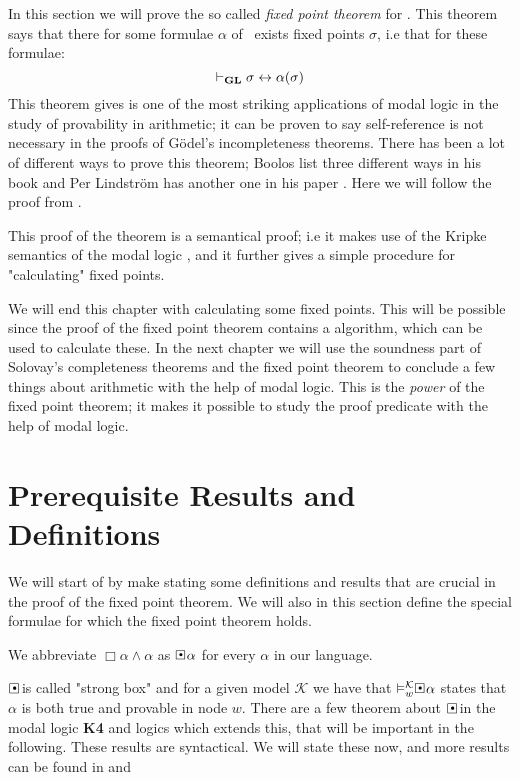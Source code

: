 \documentclass[../main.tex]{subfiles}
\begin{document}
In this section we will prove the so called \textit{fixed point theorem} for
\GL.  This theorem says that there for some formulae $\alpha$  of \GL\ exists fixed
points $\sigma$, i.e that for these formulae:
\[\vdash_{\text{\textbf{GL}}}\sigma\leftrightarrow\alpha(\sigma)\]
This theorem gives is one of the most striking applications of modal logic in
the study of provability in arithmetic; it can be proven to say self-reference is not
necessary in the proofs of Gödel's incompleteness theorems.
There has been a lot of different ways to prove this theorem; Boolos
list three different ways in his book \parencite{Boolos1993} and Per Lindström has
another one in his paper \parencite{Lind1996}. Here we
will follow the proof from \parencite{Olson1990}.

This proof of the theorem is a semantical proof; i.e it makes use of the
Kripke semantics of the modal logic \GL, and it further gives a simple
procedure for "calculating" fixed points.

We will end this chapter with calculating some fixed points. This will be
possible since the proof of the fixed point theorem contains a algorithm,
which can be used to calculate these. In the next chapter we will use the
soundness part of  Solovay's
completeness theorems and the fixed point theorem to conclude a few things
about arithmetic with the help of modal logic. This is the \textit{power} of
the fixed point theorem; it makes it possible to study the proof predicate with
the help of modal logic.

\section{Prerequisite Results and Definitions}

We will start of by make stating some definitions and results that are crucial
in the proof of the fixed point theorem. We will also in this section define
the special formulae for which the fixed point theorem holds.

\begin{defi}
	We abbreviate $\Box\alpha\wedge\alpha$ as $\sBox\alpha$ for every
	$\alpha$ in our language.
\end{defi}
$\sBox$ is called "strong box" and for a given model $\mathcal{K}$ we have that
$\vDash_w^\mathcal{K}\sBox \alpha$ states that $\alpha$ is both true and
provable in node $w$. There are a few theorem about $\sBox$ in the modal logic
\textbf{K4} and logics which extends this, that will be
important in the following. These results are syntactical. We will state these
now, and more results can be found in \parencite{Smor1985} and \parencite{Boolos1993}
\end{document}
